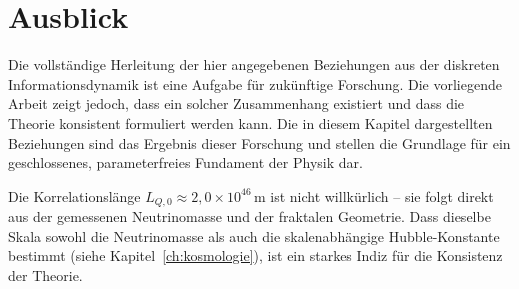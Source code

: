 \section{Ausblick}
\label{sec:naturkonstanten_ausblick}

Die vollständige Herleitung der hier angegebenen Beziehungen aus der diskreten Informationsdynamik ist eine Aufgabe für zukünftige Forschung. Die vorliegende Arbeit zeigt jedoch, dass ein solcher Zusammenhang existiert und dass die Theorie konsistent formuliert werden kann. Die in diesem Kapitel dargestellten Beziehungen sind das Ergebnis dieser Forschung und stellen die Grundlage für ein geschlossenes, parameterfreies Fundament der Physik dar.

Die Korrelationslänge \( L_{Q,0} \approx 2{,}0 \times 10^{46}\,\text{m} \) ist nicht willkürlich – sie folgt direkt aus der gemessenen Neutrinomasse und der fraktalen Geometrie. Dass dieselbe Skala sowohl die Neutrinomasse als auch die skalenabhängige Hubble-Konstante bestimmt (siehe Kapitel~\ref{ch:kosmologie}), ist ein starkes Indiz für die Konsistenz der Theorie.